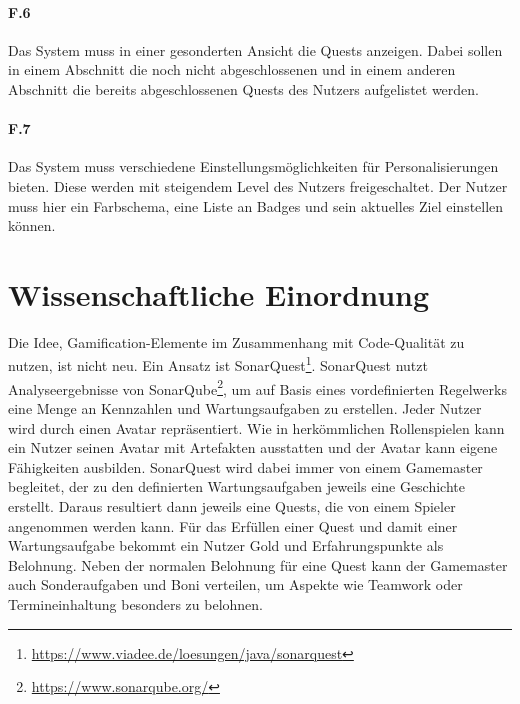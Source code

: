 \documentclass[
	oneside,  %
	ngerman, 
	final, 
	11pt, 
	a4paper, 
	1.1headlines, 
	headinclude=false, 
	footinclude=false, 
	mpinclude=false, 
	pagesize, 
	onecolumn, 
	titlepage, 
	parskip=half, 
	headsepline, 
	chapterprefix=false, 
	version=first, 
	listof=totoc, 
	bibliography=totoc, 
	toc=graduated, 
	fleqn
]{scrbook}
\begin{document}
\paragraph{F.6}
Das System muss in einer gesonderten Ansicht die Quests anzeigen.
Dabei sollen in einem Abschnitt die noch nicht abgeschlossenen und in einem anderen Abschnitt die bereits abgeschlossenen Quests des Nutzers aufgelistet werden.

\paragraph{F.7}
Das System muss verschiedene Einstellungsmöglichkeiten für Personalisierungen bieten.
Diese werden mit steigendem Level des Nutzers freigeschaltet.
Der Nutzer muss hier ein Farbschema, eine Liste an Badges und sein aktuelles Ziel einstellen können.

\section{Wissenschaftliche Einordnung}
\label{Wissenschaftliche_Einordnung}
Die Idee, Gamification-Elemente im Zusammenhang mit Code-Qualität zu nutzen, ist nicht neu.
Ein Ansatz ist SonarQuest\footnote{\url{https://www.viadee.de/loesungen/java/sonarquest}}.
SonarQuest nutzt Analyseergebnisse von SonarQube\footnote{\url{https://www.sonarqube.org/}}, um auf Basis eines vordefinierten Regelwerks eine Menge an Kennzahlen und Wartungsaufgaben zu erstellen.
Jeder Nutzer wird durch einen Avatar repräsentiert.
Wie in herkömmlichen Rollenspielen kann ein Nutzer seinen Avatar mit Artefakten ausstatten und der Avatar kann eigene Fähigkeiten ausbilden.
SonarQuest wird dabei immer von einem Gamemaster begleitet, der zu den definierten Wartungsaufgaben jeweils eine Geschichte erstellt.
Daraus resultiert dann jeweils eine Quests, die von einem Spieler angenommen werden kann.
Für das Erfüllen einer Quest und damit einer Wartungsaufgabe bekommt ein Nutzer Gold und Erfahrungspunkte als Belohnung. 
Neben der normalen Belohnung für eine Quest kann der Gamemaster auch Sonderaufgaben und Boni verteilen, um Aspekte wie Teamwork oder Termineinhaltung besonders zu belohnen.\cite{SonarQuest}
\end{document}

